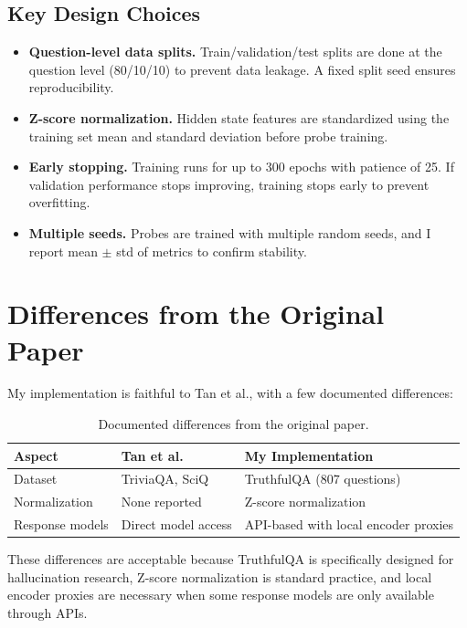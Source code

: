 \documentclass[11pt]{article}
\begin{document}
\subsection{Key Design Choices}

\begin{itemize}
    \item \textbf{Question-level data splits.} Train/validation/test splits are done at the question level (80/10/10) to prevent data leakage. A fixed split seed ensures reproducibility.
    \item \textbf{Z-score normalization.} Hidden state features are standardized using the training set mean and standard deviation before probe training.
    \item \textbf{Early stopping.} Training runs for up to 300 epochs with patience of 25. If validation performance stops improving, training stops early to prevent overfitting.
    \item \textbf{Multiple seeds.} Probes are trained with multiple random seeds, and I report mean $\pm$ std of metrics to confirm stability.
\end{itemize}

\section{Differences from the Original Paper}

My implementation is faithful to Tan et al., with a few documented differences:

\begin{table}[H]
\centering
\begin{tabular}{lll}
\toprule
\textbf{Aspect} & \textbf{Tan et al.} & \textbf{My Implementation} \\
\midrule
Dataset & TriviaQA, SciQ & TruthfulQA (807 questions) \\
Normalization & None reported & Z-score normalization \\
Response models & Direct model access & API-based with local encoder proxies \\
\bottomrule
\end{tabular}
\caption{Documented differences from the original paper.}
\end{table}

These differences are acceptable because TruthfulQA is specifically designed for hallucination research, Z-score normalization is standard practice, and local encoder proxies are necessary when some response models are only available through APIs.
\end{document}
